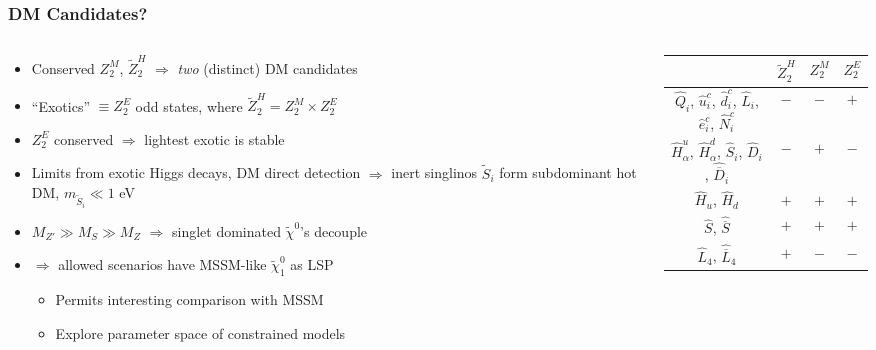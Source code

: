 \documentclass[10pt,aspectratio=169]{beamer}
\begin{document}
\begin{frame}
  \frametitle{DM Candidates?}
  \begin{columns}[t]
    \begin{column}{0.6\textwidth}
      \begin{itemize} \itemsep1.2em
      \item Conserved $Z_2^M$, $\tilde{Z}_2^H$ $\Rightarrow$
        \emph{two} (distinct) DM candidates
        \item ``Exotics'' $\equiv Z_2^E$ odd states, where
          $\tilde{Z}_2^H = Z_2^M \times Z_2^E$
      \item $Z_2^E$ conserved $\Rightarrow$ lightest exotic is stable
      \item Limits from exotic Higgs decays, DM direct detection
        $\Rightarrow$ inert singlinos $\tilde{S}_i$ form subdominant hot DM,
        $m_{\tilde{S}_i} \ll 1$ eV
      \item $M_{Z'} \gg M_S \gg M_Z$ $\Rightarrow$ {\color{orange}
        singlet dominated $\tilde{\chi}^0$'s} decouple
      \item $\Rightarrow$ allowed scenarios have
        {\color{blue} MSSM-like $\tilde{\chi}_1^0$} as LSP
        \begin{itemize} \itemsep0.5em
        \item Permits interesting comparison with MSSM
        \item Explore parameter space of constrained models
        \end{itemize}
      \end{itemize}
    \end{column}
    \begin{column}{0.4\textwidth}
      \begin{table}[ht]
        \centering
        \small
        \begin{tabular}{cccc}
          \toprule
          & $\tilde{Z}_2^H$ & $Z_2^M$ & $Z_2^E$ \\
          \midrule
          $\hat{Q}_i$, $\hat{u}_i^c$, $\hat{d}_i^c$, $\hat{L}_i$, $\hat{e}_i^c$,
          $\hat{N}_i^c$ & $-$ & $-$ & $+$ \\
          $\hat{H}_{\alpha}^u$, $\hat{H}_{\alpha}^d$, $\hat{S}_i$,
          $\hat{D}_i$, $\hat{\overline{D}}_i$ & $-$ & $+$ & $-$ \\
          $\hat{H}_u$, $\hat{H}_d$ & $+$ & $+$ & $+$ \\
          $\hat{S}$, $\hat{\overline{S}}$ & $+$ & $+$ & $+$ \\
          $\hat{L}_4$, $\hat{\overline{L}}_4$ & $+$ & $-$ & $-$ \\

\end{tabular}
\end{table}
\end{column}
\end{columns}
\end{frame}
\end{document}
